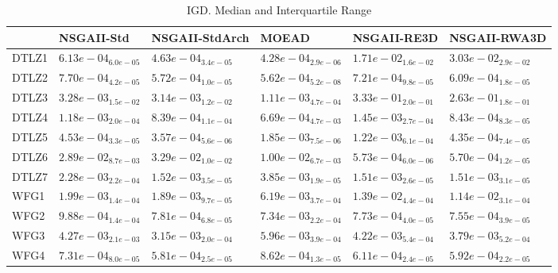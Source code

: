 \documentclass{article}
\begin{document}
\begin{table}
\caption{IGD. Median and Interquartile Range}
\label{table: IGD}
\centering
\begin{scriptsize}
\begin{tabular}{llllll}
\hline & NSGAII-Std & NSGAII-StdArch & MOEAD & NSGAII-RE3D &  NSGAII-RWA3D\\
\hline 
DTLZ1 & $  6.13e-04_{ 6.0e-05}$ & \cellcolor{gray25}$  4.63e-04_{ 3.4e-05}$ & \cellcolor{gray95}$  4.28e-04_{ 2.9e-06}$ & $  1.71e-02_{ 1.6e-02}$ & $  3.03e-02_{ 2.9e-02}$ \\
DTLZ2 & $  7.70e-04_{ 4.2e-05}$ & \cellcolor{gray25}$  5.72e-04_{ 1.0e-05}$ & \cellcolor{gray95}$  5.62e-04_{ 5.2e-08}$ & $  7.21e-04_{ 9.8e-05}$ & $  6.09e-04_{ 1.8e-05}$ \\
DTLZ3 & $  3.28e-03_{ 1.5e-02}$ & \cellcolor{gray25}$  3.14e-03_{ 1.2e-02}$ & \cellcolor{gray95}$  1.11e-03_{ 4.7e-04}$ & $  3.33e-01_{ 2.0e-01}$ & $  2.63e-01_{ 1.8e-01}$ \\
DTLZ4 & $  1.18e-03_{ 2.0e-04}$ & \cellcolor{gray25}$  8.39e-04_{ 1.1e-04}$ & \cellcolor{gray95}$  6.69e-04_{ 4.7e-03}$ & $  1.45e-03_{ 2.7e-04}$ & $  8.43e-04_{ 8.3e-05}$ \\
DTLZ5 & $  4.53e-04_{ 3.3e-05}$ & \cellcolor{gray95}$  3.57e-04_{ 5.6e-06}$ & $  1.85e-03_{ 7.5e-06}$ & $  1.22e-03_{ 6.1e-04}$ & \cellcolor{gray25}$  4.35e-04_{ 7.4e-05}$ \\
DTLZ6 & $  2.89e-02_{ 8.7e-03}$ & $  3.29e-02_{ 1.0e-02}$ & $  1.00e-02_{ 6.7e-03}$ & \cellcolor{gray25}$  5.73e-04_{ 6.0e-06}$ & \cellcolor{gray95}$  5.70e-04_{ 1.2e-05}$ \\
DTLZ7 & $  2.28e-03_{ 2.2e-04}$ & $  1.52e-03_{ 3.5e-05}$ & $  3.85e-03_{ 1.9e-05}$ & \cellcolor{gray25}$  1.51e-03_{ 2.6e-05}$ & \cellcolor{gray95}$  1.51e-03_{ 3.1e-05}$ \\
WFG1 & \cellcolor{gray25}$  1.99e-03_{ 1.4e-04}$ & \cellcolor{gray95}$  1.89e-03_{ 9.7e-05}$ & $  6.19e-03_{ 3.7e-04}$ & $  1.39e-02_{ 4.4e-04}$ & $  1.14e-02_{ 3.1e-04}$ \\
WFG2 & $  9.88e-04_{ 1.4e-04}$ & $  7.81e-04_{ 6.8e-05}$ & $  7.34e-03_{ 2.2e-04}$ & \cellcolor{gray25}$  7.73e-04_{ 4.0e-05}$ & \cellcolor{gray95}$  7.55e-04_{ 3.9e-05}$ \\
WFG3 & $  4.27e-03_{ 2.1e-03}$ & \cellcolor{gray95}$  3.15e-03_{ 2.0e-04}$ & $  5.96e-03_{ 3.9e-04}$ & $  4.22e-03_{ 5.4e-04}$ & \cellcolor{gray25}$  3.79e-03_{ 5.2e-04}$ \\
WFG4 & $  7.31e-04_{ 8.0e-05}$ & \cellcolor{gray95}$  5.81e-04_{ 2.5e-05}$ & $  8.62e-04_{ 1.3e-05}$ & $  6.11e-04_{ 2.4e-05}$ & \cellcolor{gray25}$  5.92e-04_{ 2.2e-05}$ \\

\end{tabular}
\end{scriptsize}
\end{table}
\end{document}
